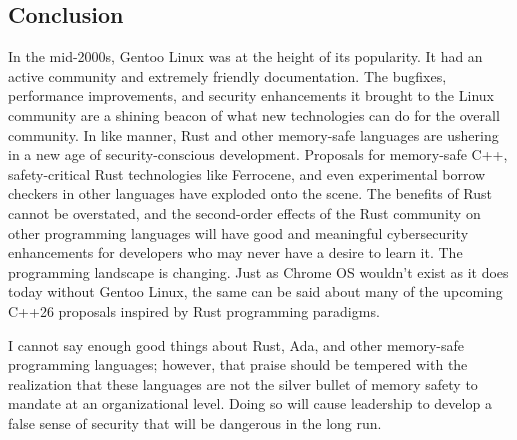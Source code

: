 \subsection*{Conclusion}
In the mid-2000s, Gentoo Linux was at the height of its popularity. It had an active community and extremely friendly documentation. The bugfixes, performance improvements, and security enhancements it brought to the Linux community are a shining beacon of what new technologies can do for the overall community. In like manner, Rust and other memory-safe languages are ushering in a new age of security-conscious development. Proposals for memory-safe C++, safety-critical Rust technologies like Ferrocene, and even experimental borrow checkers in other languages have exploded onto the scene. The benefits of Rust cannot be overstated, and the second-order effects of the Rust community on other programming languages will have good and meaningful cybersecurity enhancements for developers who may never have a desire to learn it. The programming landscape is changing. Just as Chrome OS wouldn't exist as it does today without Gentoo Linux, the same can be said about many of the upcoming C++26 proposals inspired by Rust programming paradigms.

I cannot say enough good things about Rust, Ada, and other memory-safe programming languages; however, that praise should be tempered with the realization that these languages are not the silver bullet of memory safety to mandate at an organizational level. Doing so will cause leadership to develop a false sense of security that will be dangerous in the long run.
